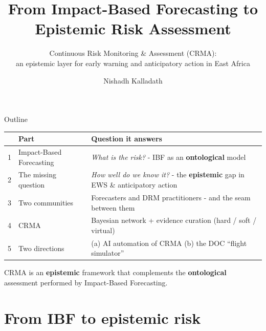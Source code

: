\documentclass[aspectratio=3218]{beamer}
\title[CRMA]{From Impact-Based Forecasting to Epistemic Risk Assessment}
\subtitle{Continuous Risk Monitoring \& Assessment (CRMA): \\ an epistemic layer for early warning and anticipatory action in East Africa}
\author{Nishadh Kalladath}
\institute[CRMA \textbar\ CRAF'd \textbar\ ICPAC]{%
	Disaster Risk Management Unit, IGAD Climate Prediction \& Applications Centre \\
}
\begin{document}
{
\begin{frame}
	\maketitle
\end{frame}
}



\begin{frame}[label=outline]{Outline}
	\vspace*{1ex}
	\begin{center}\small
	\begin{tabular}{@{}clp{9.5cm}@{}}
		\toprule
		 & \textbf{Part} & \textbf{Question it answers} \\
		\midrule
		1 & Impact-Based Forecasting & \emph{What is the risk?} - IBF as an \textbf{ontological} model \\
		2 & The missing question & \emph{How well do we know it?} - the \textbf{epistemic} gap in EWS \& anticipatory action \\
		3 & Two communities & Forecasters and DRM practitioners - and the seam between them \\
		4 & CRMA & Bayesian network + evidence curation (hard / soft / virtual) \\
		5 & Two directions & (a) AI automation of CRMA \quad (b) the DOC ``flight simulator'' \\
		\bottomrule
	\end{tabular}
	\end{center}
	\vspace*{1ex}
	\begin{block}{}
		\centering
		CRMA is an \textbf{epistemic} framework that complements the
		\textbf{ontological} assessment performed by Impact-Based Forecasting.
	\end{block}
\end{frame}

\section{From IBF to epistemic risk}
\end{document}
